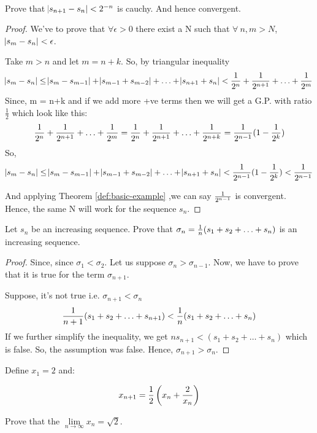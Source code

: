 \documentclass{notes}
\begin{document}
\paragraph{}
\begin{problem}
	Prove that $\abs{s_{n+1}-s_n} < 2^{-n}$ is cauchy. And hence convergent.
	\label{problem-2^n}
\end{problem}
\begin{proof}
	We've to prove that $\forall \epsilon>0$ there exist a N such that $\forall\ n,m>N$, $\abs{s_{m}-s_n} < \epsilon$.
	
	Take $m>n$ and let $m = n+k$. So, by triangular inequality 
	$$
	\abs{s_m - s_n} \leq \abs{s_m - s_{m-1}} + \abs{s_{m-1}+s_{m-2}}+ \ldots+ \abs{s_{n+1}+s_n} < {1 \over 2^{n}} + {1 \over 2^{n+1}} +\ldots+{1 \over 2^{m}}
	$$
	Since, m = n+k and if we add more +ve terms then we will get a G.P. with ratio $\frac{1}{2}$ which look like this:
	$$
	{1 \over 2^{n}} + {1 \over 2^{n+1}} +\ldots+{1 \over 2^{m}} = {1 \over 2^{n}} + {1 \over 2^{n+1}} +\ldots+{1 \over 2^{n+k}} = {1 \over 2^{n-1}}(1 - {1 \over 2^k})
	$$
	So, $$
	\abs{s_m - s_n} \leq \abs{s_m - s_{m-1}} + \abs{s_{m-1}+s_{m-2}}+ \ldots+ \abs{s_{n+1}+s_n}<{1 \over 2^{n-1}}(1 - {1 \over 2^k})<{1 \over 2^{n-1}}$$
	
	And applying Theorem \ref{def:basic-example} ,we can say ${1 \over 2^{n-1}}$ is convergent. Hence, the same N will work for the sequence $s_n$.
\end{proof}
\begin{problem}
	Let $s_n$ be an increasing sequence. Prove that $\sigma_n = {1 \over n}(s_1 + s_2 + \ldots+s_n)$ is an increasing sequence.
\end{problem}
\begin{proof}
	Since, since $\sigma_1 < \sigma_2$. Let us suppose $\sigma_n > \sigma_{n-1}$. Now, we have to prove that it is true for the term $\sigma_{n+1}$.
	
	Suppose, it's not true i.e. $\sigma_{n+1}<\sigma_n$  
	$$ {1 \over {n+1}}(s_1 + s_2 + \ldots + s_{n+1}) < {1 \over {n}}(s_1 + s_2 + \ldots + s_{n})$$
	If we further simplify the inequality, we get $ns_{n+1}<(s_1 + s_2 + \ldots + s_{n})$ which is false.
	So, the assumption was false. Hence, $\sigma_{n+1} > \sigma_n$.
\end{proof}
\begin{problem}
	Define $x_1 = 2$ and:
	
	$$  x_{n+1} = {1 \over 2}\left(x_n + {2 \over x_n}\right) $$
	
	Prove that the $\lim\limits_{n \to \infty} x_n = \sqrt{2}$.
\end{problem}
\end{document}
